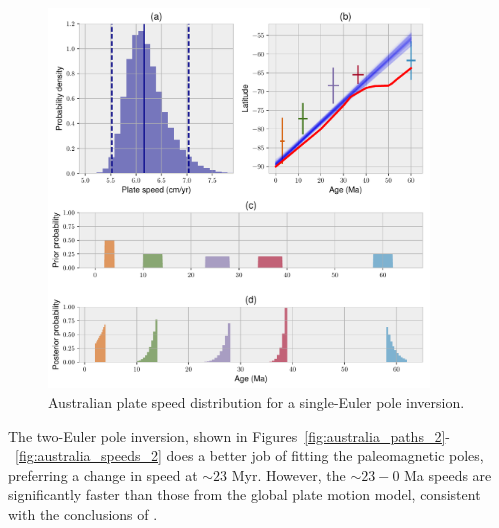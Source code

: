\documentclass[preprint,12pt,authoryear]{elsarticle}
\begin{document}
\begin{figure}
\includegraphics[width=0.9\textwidth]{figures/australia/australia_speeds_1.pdf}
\caption[Australian plate speed distribution for a single-Euler pole inversion]{Australian plate speed distribution for a single-Euler pole inversion.}
\label{fig:australia_speeds_1}
\end{figure}

The two-Euler pole inversion, shown in Figures~\ref{fig:australia_paths_2}-~\ref{fig:australia_speeds_2} does a better job of
fitting the paleomagnetic poles, preferring a change in speed at $\sim 23$ Myr.
However, the $\sim23-0$ Ma speeds are significantly faster than those from the global plate motion model,
consistent with the conclusions of \citet{idnurm1985lateII}.
\end{document}
